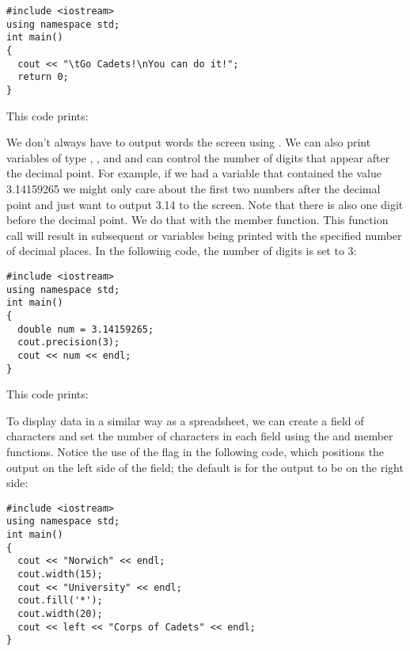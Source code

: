 \noindent\begin{minipage}{\linewidth}\begin{lstlisting}
#include <iostream>
using namespace std;
int main()
{
  cout << "\tGo Cadets!\nYou can do it!";
  return 0;
}
\end{lstlisting}\end{minipage}

\noindent This code prints: 


\noindent {}

We don't always have to output words the screen using . 
We can also print variables of type , , and  and can control the number of digits that appear after the decimal point. 
For example, if we had a variable that contained the value 3.14159265 we might only care about the first two numbers after the decimal point and just want to output 3.14 to the screen.
Note that there is also one digit before the decimal point.
We do that with the  member function. 
This function call will result in subsequent  or  variables being printed with the specified number of decimal places. 
In the following code, the number of digits is set to 3:

\noindent\begin{minipage}{\linewidth}\begin{lstlisting}
#include <iostream>
using namespace std;
int main()
{
  double num = 3.14159265;
  cout.precision(3);
  cout << num << endl;
}
\end{lstlisting}\end{minipage}

\noindent This code prints:

\noindent {}

To display data in a similar way as a spreadsheet, we can create a field of characters and set the number of characters in each field using the  and  member functions. 
Notice the use of the  flag in the following code, which positions the output on the left side of the field; the default is for the output to be on the right side:

\noindent\begin{minipage}{\linewidth}\begin{lstlisting}
#include <iostream>
using namespace std;
int main()
{
  cout << "Norwich" << endl;
  cout.width(15);
  cout << "University" << endl;
  cout.fill('*');
  cout.width(20);
  cout << left << "Corps of Cadets" << endl;
}
\end{lstlisting}\end{minipage}

